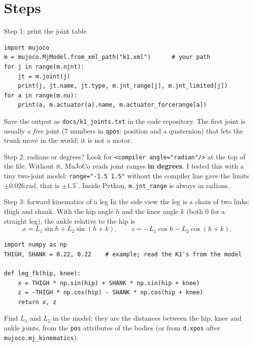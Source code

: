 \section*{Steps}
\begin{stepbox}{Step 1: print the joint table}
\begin{verbatim}
import mujoco
m = mujoco.MjModel.from_xml_path("k1.xml")      # your path
for j in range(m.njnt):
    jt = m.joint(j)
    print(j, jt.name, jt.type, m.jnt_range[j], m.jnt_limited[j])
for a in range(m.nu):
    print(a, m.actuator(a).name, m.actuator_forcerange[a])
\end{verbatim}
Save the output as \texttt{docs/k1\_joints.txt} in the code repository. The first joint is usually a \emph{free} joint ($7$ numbers in \texttt{qpos}: position and a quaternion) that lets the trunk move in the world; it is not a motor.
\end{stepbox}

\begin{stepbox}{Step 2: radians or degrees?}
Look for \texttt{<compiler angle="radian"/>} at the top of the file. Without it, MuJoCo reads joint ranges \textbf{in degrees}. I tested this with a tiny two-joint model: \verb!range="-1.5 1.5"! without the compiler line gave the limits $\pm0.026$\,rad, that is $\pm1.5^\circ$. Inside Python, \texttt{m.jnt\_range} is always in radians.
\end{stepbox}

\begin{stepbox}{Step 3: forward kinematics of a leg}
In the side view the leg is a chain of two links: thigh and shank. With the hip angle $h$ and the knee angle $k$ (both $0$ for a straight leg), the ankle relative to the hip is
\[
x = L_1\sin h + L_2\sin(h+k),\qquad z = -L_1\cos h - L_2\cos(h+k).
\]
\begin{verbatim}
import numpy as np
THIGH, SHANK = 0.22, 0.22    # example; read the K1's from the model

def leg_fk(hip, knee):
    x = THIGH * np.sin(hip) + SHANK * np.sin(hip + knee)
    z = -THIGH * np.cos(hip) - SHANK * np.cos(hip + knee)
    return x, z
\end{verbatim}
Find $L_1$ and $L_2$ in the model: they are the distances between the hip, knee and ankle joints, from the \texttt{pos} attributes of the bodies (or from \texttt{d.xpos} after \verb!mujoco.mj_kinematics!).
\end{stepbox}

